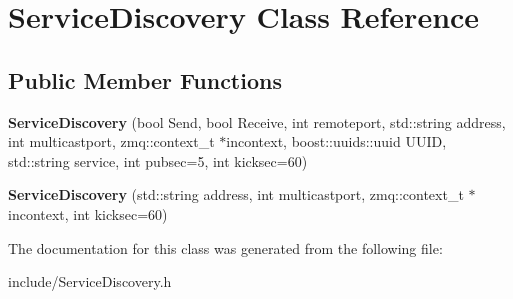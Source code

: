 \hypertarget{classServiceDiscovery}{\section{Service\-Discovery Class Reference}
\label{classServiceDiscovery}
}
\subsection*{Public Member Functions}
\begin{DoxyCompactItemize}
\item 
\hypertarget{classServiceDiscovery_ab69c2cacaf5a388fac88e57f3361b576}{{\bfseries Service\-Discovery} (bool Send, bool Receive, int remoteport, std\-::string address, int multicastport, zmq\-::context\-\_\-t $\ast$incontext, boost\-::uuids\-::uuid U\-U\-I\-D, std\-::string service, int pubsec=5, int kicksec=60)}\label{classServiceDiscovery_ab69c2cacaf5a388fac88e57f3361b576}

\item 
\hypertarget{classServiceDiscovery_a3dbd15f19345b0c9746731308e26b034}{{\bfseries Service\-Discovery} (std\-::string address, int multicastport, zmq\-::context\-\_\-t $\ast$incontext, int kicksec=60)}\label{classServiceDiscovery_a3dbd15f19345b0c9746731308e26b034}

\end{DoxyCompactItemize}


The documentation for this class was generated from the following file\-:\begin{DoxyCompactItemize}
\item 
include/Service\-Discovery.\-h\end{DoxyCompactItemize}
